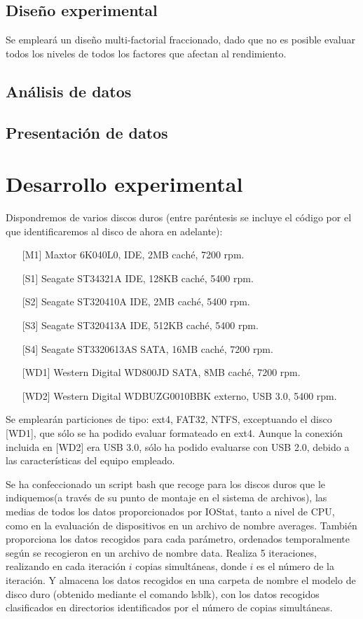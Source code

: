 \documentclass[a4paper,10pt]{article}
\renewcommand{\texttt}[2][black!60]{\textcolor{#1}{\ttfamily #2}}
\begin{document}
 \subsection{Diseño experimental}
 Se empleará un diseño multi-factorial fraccionado, dado que no es posible evaluar todos los niveles de todos los factores
 que afectan al rendimiento. 
 
 \subsection{Análisis de datos}
 
 \subsection{Presentación de datos}
 
 
 \section{Desarrollo experimental}
Dispondremos de varios discos duros (entre paréntesis se incluye el código por el que identificaremos al disco
de ahora en adelante): \label{discos}
\begin{itemize}
 \item [][M1] Maxtor 6K040L0, IDE, 2MB caché, 7200 rpm.
 \item [][S1] Seagate ST34321A IDE, 128KB caché, 5400 rpm.
 \item [][S2] Seagate ST320410A IDE, 2MB caché, 5400 rpm. 
 \item [][S3] Seagate ST320413A IDE, 512KB caché, 5400 rpm.
 \item [][S4] Seagate ST3320613AS SATA, 16MB caché, 7200 rpm. 
 \item [][WD1] Western Digital WD800JD SATA, 8MB caché, 7200 rpm.
 \item [][WD2] Western Digital WDBUZG0010BBK externo, USB 3.0, 5400 rpm.
\end{itemize}
Se emplearán particiones de tipo: ext4, FAT32, NTFS, exceptuando el disco [WD1], que sólo se ha podido evaluar
formateado en ext4. Aunque la conexión incluida en [WD2] era USB 3.0, sólo ha podido evaluarse con USB 2.0, debido
a las características del equipo empleado.

Se ha confeccionado un script \texttt{bash} que recoge para los discos duros que le indiquemos(a través de su punto de montaje
en el sistema de archivos), las medias de todos los datos proporcionados por IOStat, tanto a nivel de CPU, como
en la evaluación de dispositivos en un archivo de nombre \texttt{averages}. También proporciona los datos recogidos
para cada parámetro, ordenados temporalmente según se recogieron en un archivo de nombre \texttt{data}. Realiza 
5 iteraciones, realizando en cada iteración $i$ copias simultáneas, donde $i$ es el número de la iteración. Y almacena
los datos recogidos en una carpeta de nombre el modelo de disco duro (obtenido mediante el comando \texttt{lsblk}), con
los datos recogidos clasificados en directorios identificados por el número de copias simultáneas.



\newpage

\newpage
\printbibliography
\end{document}
